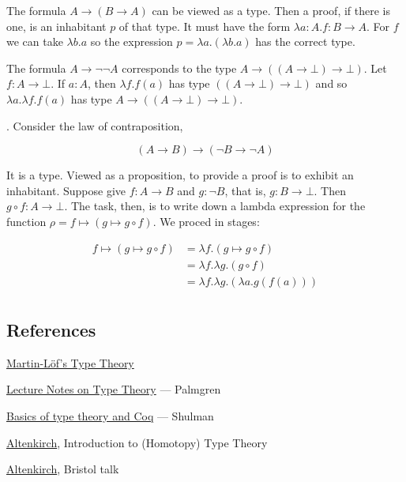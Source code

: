  The formula $A \to (B \to A)$ can be viewed as a type.  Then a proof, if there is one, is an inhabitant $p$ of that type. It must have the form $\lambda a: A.f:B \to A$.  For $f$ we can take $\lambda b.a$ so the expression $p = \lambda a.(\lambda b.a)$ has the correct type.




 The formula $A \to \neg \neg A$ corresponds to the type $A \to ((A \to \bot) \to \bot)$.  Let $f : A \to \bot$. If $a:A$, then $\lambda f . f(a)$ has type $((A \to \bot) \to \bot)$ and so $\lambda a. \lambda f . f(a)$ has type  $A \to ((A \to \bot) \to \bot)$.




. Consider the law of contraposition,

$$
(A \to B) \to (\neg B \to \neg A)
$$

It is a type.  Viewed as a proposition, to provide a proof is to exhibit an inhabitant.  Suppose give $f : A \to B$ and $g : \neg B$, that is,
$g : B \to \bot$.  Then $g\circ f : A \to \bot$.  The task, then, is to write down a lambda expression for the function $\rho =  f \mapsto (g \mapsto g\circ f)$.  We proced in stages:

\begin{align}
f \mapsto (g \mapsto g\circ f) & = \lambda f .(g \mapsto g\circ f)\\
 & = \lambda f . \lambda g . (g\circ f) \\
& = \lambda f . \lambda g . (\lambda a. g(f(a))) \\
\end{align}

\subsection{References}

\href{http://www.cse.chalmers.se/~smith/handbook.pdf}{Martin-Löf's Type Theory}

\href{http://staff.math.su.se/palmgren/lecturenotesTT.pdf}{Lecture Notes on Type Theory} — Palmgren

\href{https://home.sandiego.edu/~shulman/hottseminar2012/02typetheory-handout2up.pdf}{Basics of type theory and Coq} — Shulman

\href{http://www.cs.nott.ac.uk/~psztxa/talks/fmv18.pdf}{Altenkirch}, Introduction to (Homotopy) Type Theory

\href{http://www.cs.nott.ac.uk/~psztxa/talks/bristol-16.pdf}{Altenkirch}, Bristol talk

